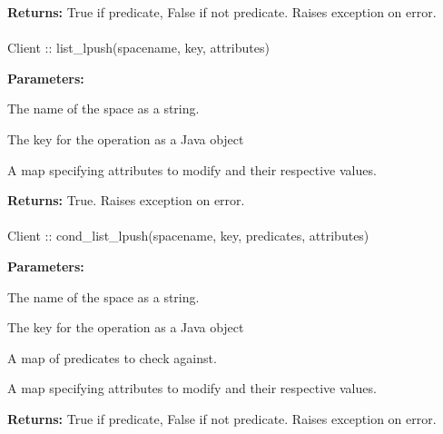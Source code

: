 \noindent\textbf{Returns:}
True if predicate, False if not predicate.  Raises exception on error.

\paragraph{}
\label{api:java:list_lpush}
\begin{javacode}
Client :: list_lpush(spacename, key, attributes)
\end{javacode}
\funcdesc 

\noindent\textbf{Parameters:}
\begin{description}[labelindent=\widthof{{\code{attributes}}},leftmargin=*,noitemsep,nolistsep,align=right]
\item[\code{spacename}] The name of the space as a string.
\item[\code{key}] The key for the operation as a Java object
\item[\code{attributes}] A map specifying attributes to modify and their respective values.
\end{description}

\noindent\textbf{Returns:}
True.  Raises exception on error.

\paragraph{}
\label{api:java:cond_list_lpush}
\begin{javacode}
Client :: cond_list_lpush(spacename, key, predicates, attributes)
\end{javacode}
\funcdesc 

\noindent\textbf{Parameters:}
\begin{description}[labelindent=\widthof{{\code{predicates}}},leftmargin=*,noitemsep,nolistsep,align=right]
\item[\code{spacename}] The name of the space as a string.
\item[\code{key}] The key for the operation as a Java object
\item[\code{predicates}] A map of predicates to check against.
\item[\code{attributes}] A map specifying attributes to modify and their respective values.
\end{description}

\noindent\textbf{Returns:}
True if predicate, False if not predicate.  Raises exception on error.

